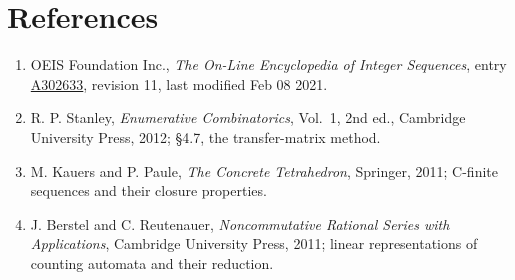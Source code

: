 \documentclass[11pt]{article}
\theoremstyle{definition}
\begin{document}
\section{References}

\begin{enumerate}

\item OEIS Foundation Inc., \emph{The On-Line Encyclopedia of Integer Sequences}, entry \href{https://oeis.org/A302633}{A302633}, revision 11, last modified Feb 08 2021.

\item R. P. Stanley, \emph{Enumerative Combinatorics}, Vol.~1, 2nd ed., Cambridge University Press, 2012; \S4.7, the transfer-matrix method.

\item M. Kauers and P. Paule, \emph{The Concrete Tetrahedron}, Springer, 2011; C-finite sequences and their closure properties.

\item J. Berstel and C. Reutenauer, \emph{Noncommutative Rational Series with Applications}, Cambridge University Press, 2011; linear representations of counting automata and their reduction.

\end{enumerate}
\end{document}
